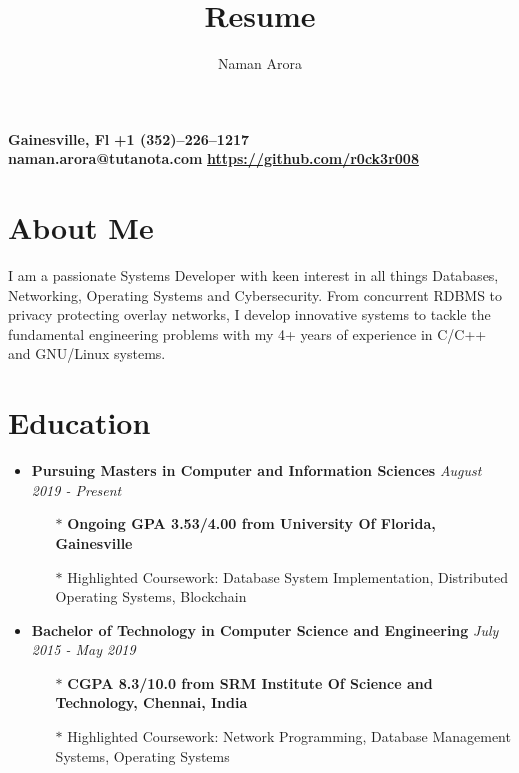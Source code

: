 \documentclass[10pt,a4paper]{article}
\makeatletter
\renewcommand{\maketitle}
{
	\begin{flushleft}
		\textbf{\Huge\theauthor}
	\end{flushleft}
	\begin{flushleft}
		\small{\textbf{{\faMapMarker} \hspace{0.2cm} Gainesville, Fl} \hspace{2.5cm} \textbf{{\faMobile} \hspace{0.2cm} +1 (352)--226--1217} \\
				\textbf{{\faEnvelope} \hspace{0.1cm} naman.arora@tutanota.com} \hspace{0.5cm}
				\textbf{{\faGithub} \hspace{0.1cm} \href{https://github.com/r0ck3r008}{https://github.com/r0ck3r008}}}
	\end{flushleft}
}
\makeatother
\begin{document}
\title{Resume}
\author{Naman Arora}
\maketitle


\section{{\faUser} About Me}
\begin{flushleft}
	I am a passionate Systems Developer with keen interest in all things Databases, Networking, Operating Systems and Cybersecurity. From concurrent RDBMS to privacy protecting overlay networks, I develop innovative systems to tackle the fundamental engineering problems with my 4+ years of experience in C/C++ and GNU/Linux systems.
\end{flushleft}

\section{{\faUniversity} Education}

\begin{itemize}[noitemsep,nolistsep]
	\item\textbf{Pursuing Masters in Computer and Information Sciences} \hfill \textit{August 2019 - Present}
		\begin{itemize}[leftmargin=*]
			\setlength\itemsep{-0.25em}
			\item[$\ast$]\textbf{Ongoing GPA 3.53/4.00 from University Of Florida, Gainesville}
			\item[$\ast$]Highlighted Coursework: Database System Implementation, Distributed Operating Systems, Blockchain
		\end{itemize}
	\item\textbf{Bachelor of Technology in Computer Science and Engineering} \hfill \textit{July 2015 - May 2019}
		\begin{itemize}[leftmargin=*]
			\setlength\itemsep{-0.25em}
			\item[$\ast$]\textbf{CGPA 8.3/10.0 from SRM Institute Of Science and Technology, Chennai, India}
			\item[$\ast$]Highlighted Coursework: Network Programming, Database Management Systems, Operating Systems
		\end{itemize}
\end{itemize}
\end{document}
